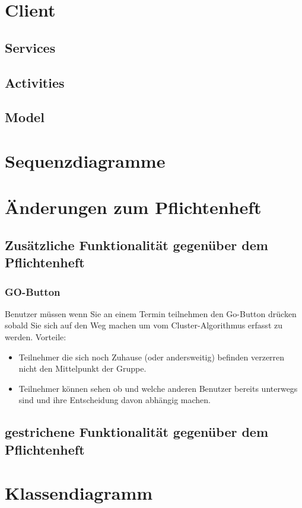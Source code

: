 \documentclass{scrartcl}
\begin{document}
	\section{Client} 
	\subsection{Services}
	\subsection{Activities}
	\subsection{Model}
	\newpage

	\section{Sequenzdiagramme}
	\newpage

	\section{Änderungen zum Pflichtenheft}
	\subsection{Zusätzliche Funktionalität gegenüber dem Pflichtenheft}
	\subsubsection{GO-Button}
		Benutzer müssen wenn Sie an einem Termin teilnehmen den Go-Button drücken sobald Sie sich auf den Weg machen um vom Cluster-Algorithmus erfasst zu werden. 
		\newline
		Vorteile:
		\begin{itemize}
		\item Teilnehmer die sich noch Zuhause (oder andersweitig) befinden verzerren nicht den Mittelpunkt der Gruppe.
		\item Teilnehmer können sehen ob und welche anderen Benutzer bereits unterwegs sind und ihre Entscheidung davon abhängig machen.
		\end{itemize}
	\subsection{gestrichene Funktionalität gegenüber dem Pflichtenheft}
	\newpage
	
	\section{Klassendiagramm}	
\end{document}
